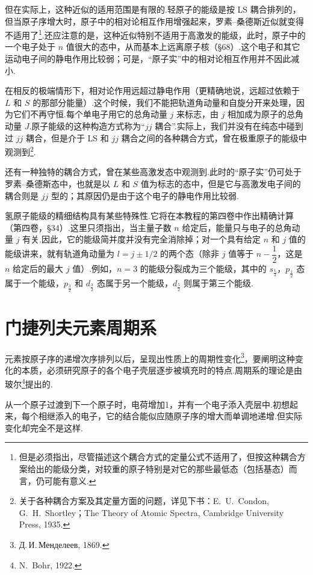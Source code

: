 但在实际上，这种近似的适用范围是有限的.轻原子的能级是按 LS 耦合排列的，但当原子序增大时，原子中的相对论相互作用增强起来，罗素–桑德斯近似就变得不适用了\footnote{但是必须指出，尽管描述这个耦合方式的定量公式不适用了，但按这种耦合方案给出的能级分类，对较重的原子特别是对它的那些最低态（包括基态）而言，仍可能有意义.}.还应注意的是，这种近似特别不适用于高激发的能级，此时，原子中的一个电子处于 $n$ 值很大的态中，从而基本上远离原子核（§68）.这个电子和其它运动电子间的静电作用比较弱；可是，“原子实”中的相对论相互作用并不因此减小.

在相反的极端情形下，相对论作用远超过静电作用（更精确地说，远超过依赖于 $L$ 和 $S$ 的那部分能量）.这个时候，我们不能把轨道角动量和自旋分开来处理，因为它们不再守恒.每个单电子用它的总角动量 $j$ 来标志，由 $j$ 相加成为原子的总角动量 $J$.原子能级的这种构造方式称为“$jj$ 耦合”.实际上，我们并没有在纯态中碰到过 $jj$ 耦合，但是介于 LS 和 $jj$ 耦合之间的各种耦合方式，曾在极重原子的能级中观测到\footnote{关于各种耦合方案及其定量方面的问题，详见下书：E.~U.~Condon, G.~H.~Shortley；The Theory of Atomic Spectra, Cambridge University Press, 1935.}.

还有一种独特的耦合方式，曾在某些高激发态中观测到.此时的“原子实”仍可处于罗素–桑德斯态中，也就是以 $L$ 和 $S$ 值为标志的态中，但是它与高激发电子间的耦合则是 $jj$ 型的；其原因仍是由于这个电子的静电作用比较弱.

氢原子能级的精细结构具有某些特殊性.它将在本教程的第四卷中作出精确计算（第四卷，§34）.这里只须指出，当主量子数 $n$ 给定后，能量只与电子的总角动量 $j$ 有关.因此，它的能级简并度并没有完全消除掉；对一个具有给定 $n$ 和 $j$ 值的能级讲来，就有轨道角动量为 $l=j\pm1/2$ 的两个态（除非 $j$ 值等于 $n-\dfrac{1}{2}$，这是 $n$ 给定后的最大 $j$ 值）.例如，$n=3$ 的能级分裂成为三个能级，其中的 $s_{\frac{1}{2}}$，$p_{\frac{1}{2}}$ 态属于一个能级，$p_{\frac{3}{2}}$ 和 $d_{\frac{3}{2}}$ 态属于另一个能级，$d_{\frac{5}{2}}$ 则属于第三个能级.

\section{门捷列夫元素周期系}

元素按原子序的递增次序排列以后，呈现出性质上的周期性变化\footnote{Д.\,И.\,Менделеев, 1869.}，要阐明这种变化的本质，必须研究原子的各个电子壳层逐步被填充时的特点.周期系的理论是由玻尔\footnote{N.~Bohr, 1922.}提出的.

从一个原子过渡到下一个原子时，电荷增加1，并有一个电子添入壳层中.初想起来，每个相继添入的电子，它的结合能似应随原子序的增大而单调地递增.但实际变化却完全不是这样.

